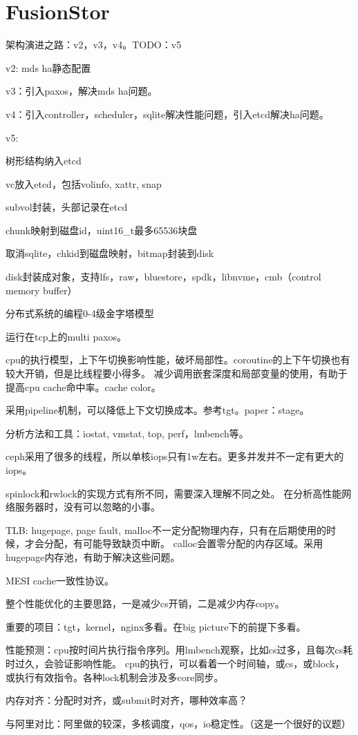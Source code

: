 \chapter{FusionStor}

架构演进之路：v2，v3，v4。TODO：v5

v2: mds ha静态配置

v3：引入paxos，解决mds ha问题。

v4：引入controller，scheduler，sqlite解决性能问题，引入etcd解决ha问题。

v5:
\begin{compactenum}
\item 树形结构纳入etcd
\item vc放入etcd，包括volinfo, xattr, snap
\item subvol封装，头部记录在etcd
\item chunk映射到磁盘id，uint16_t最多65536块盘
\item 取消sqlite，chkid到磁盘映射，bitmap封装到disk
\item disk封装成对象，支持lfs，raw，bluestore，spdk，libnvme，cmb（control memory buffer）
\end{compactenum}

分布式系统的编程0-4级金字塔模型

运行在tcp上的multi paxos。

cpu的执行模型，上下午切换影响性能，破坏局部性。coroutine的上下午切换也有较大开销，但是比线程要小得多。
减少调用嵌套深度和局部变量的使用，有助于提高cpu cache命中率。cache color。

采用pipeline机制，可以降低上下文切换成本。参考tgt。paper：stage。

分析方法和工具：iostat, vmstat, top, perf，lmbench等。

ceph采用了很多的线程，所以单核iops只有1w左右。更多并发并不一定有更大的iops。

spinlock和rwlock的实现方式有所不同，需要深入理解不同之处。
在分析高性能网络服务器时，没有可以忽略的小事。

TLB: hugepage, page fault, malloc不一定分配物理内存，只有在后期使用的时候，才会分配，有可能导致缺页中断。
calloc会置零分配的内存区域。采用hugepage内存池，有助于解决这些问题。

MESI cache一致性协议。

整个性能优化的主要思路，一是减少cs开销，二是减少内存copy。

重要的项目：tgt，kernel，nginx多看。在big picture下的前提下多看。

性能预测：cpu按时间片执行指令序列。用lmbench观察，比如cs过多，且每次cs耗时过久，会验证影响性能。
cpu的执行，可以看着一个时间轴，或cs，或block，或执行有效指令。各种lock机制会涉及多core同步。

内存对齐：分配时对齐，或submit时对齐，哪种效率高？

与阿里对比：阿里做的较深，多核调度，qos，io稳定性。（这是一个很好的议题）
